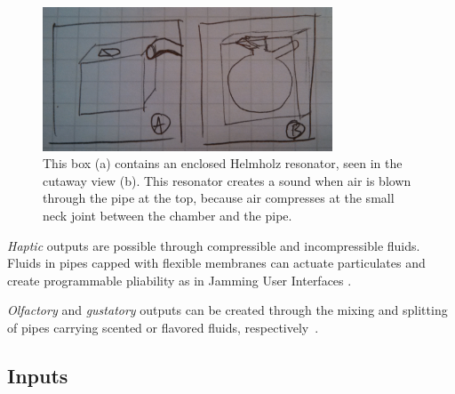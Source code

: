 \begin{figure}[h]
\centering
    \includegraphics[width=3.4in]{figures/placeholder/helmholz.jpg}
\caption{This box (a) contains an enclosed Helmholz resonator, seen in the cutaway view (b).  This resonator creates a sound when air is blown through the pipe at the top, because air compresses at the small neck joint between the chamber and the pipe.  }
\label{fig:ocarina}
\end{figure}

\emph{Haptic} outputs are possible through compressible and incompressible fluids.  Fluids in pipes capped with flexible membranes can actuate particulates and create programmable pliability as in Jamming User Interfaces \cite{Follmer-jamming}. 

\emph{Olfactory} and \emph{gustatory} outputs can be created through the mixing and splitting of pipes carrying scented or flavored fluids, respectively~\cite{kaye2004making}.

\subsection{Inputs}

